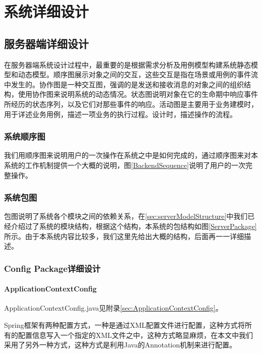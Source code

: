 
\chapter{系统详细设计}
\section{服务器端详细设计}
在服务器端系统设计过程中，最重要的是根据需求分析及用例模型构建系统静态模型和动态模型。顺序图展示对象之间的交互，这些交互是指在场景或用例的事件流中发生的。协作图是一种交互图，强调的是发送和接收消息的对象之间的组织结构，使用协作图来说明系统的动态情况。状态图说明对象在它的生命期中响应事件所经历的状态序列，以及它们对那些事件的响应。活动图是主要用于业务建模时，用于详述业务用例，描述一项业务的执行过程。设计时，描述操作的流程\cite{zhanghaipan1998}。

\subsection{系统顺序图}
我们用顺序图来说明用户的一次操作在系统之中是如何完成的，通过顺序图来对本系统的工作机制提供一个大概的说明，图\ref{BackendSequence}说明了用户的一次完整操作。


\subsection{系统包图}
包图说明了系统各个模块之间的依赖关系，在\ref{sec:serverModelStructure}中我们已经介绍过了系统的模块结构，根据这个结构，本系统的包结构如图\ref{ServerPackage}所示。由于本系统内容比较多，我们这里先给出大概的结构，后面再一一详细描述。

\subsection{Config Package详细设计}


\subsubsection{ApplicationContextConfig}
ApplicationContextConfig.java见附录\ref{sec:ApplicationContextConfig}。

Spring框架有两种配置方式，一种是通过XML配置文件进行配置，这种方式将所有的配置信息写入一个指定的XML文件之中，这种方式略显麻烦，在本文中我们采用了另外一种方式，这种方式是利用Java的Annotation机制来进行配置。

